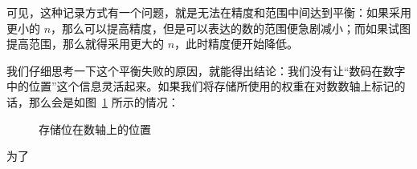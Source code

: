     可见，这种记录方式有一个问题，就是无法在精度和范围中间达到平衡：如果采用更小的 $n$，那么可以提高精度，但是可以表达的数的范围便急剧减小；而如果试图提高范围，那么就得采用更大的 $n$，此时精度便开始降低。

    我们仔细思考一下这个平衡失败的原因，就能得出结论：我们没有让“数码在数字中的位置”这个信息灵活起来。如果我们将存储所使用的权重在对数数轴上标记的话，那么会是如图~\ref{fig:NumberSystemBasics/floating-point/position-of-fixed-point} 所示的情况：

    \begin{figure}
        \centering
        \caption{存储位在数轴上的位置}
        \label{fig:NumberSystemBasics/floating-point/position-of-fixed-point}
    \end{figure}

    为了
